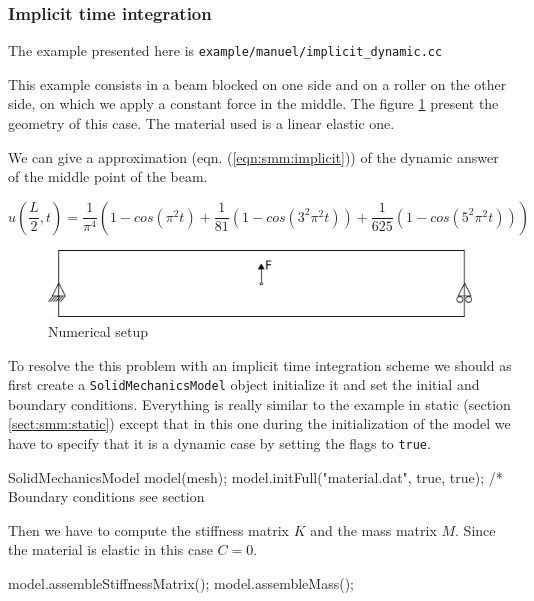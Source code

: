 \documentclass[a4paper,11pt]{book}
\newcommand{\code}[1]{{\tt{#1}}}
\begin{document}
\subsubsection{Implicit time integration}
The example presented here is \code{example/manuel/implicit\_dynamic.cc}

This example consists in a beam blocked on one side and on a roller on the other
side,  on  which   we  apply  a  constant  force  in   the  middle.  The  figure
\ref{fig:smm:implicit:dynamic} present  the geometry of this  case. The material
used is a linear elastic one.

We  can give  a  approximation (eqn.  (\ref{eqn:smm:implicit}))  of the  dynamic
answer of the middle point of the beam.

\begin{equation}\label{eqn:smm:implicit}
  u(\frac{L}{2}, t) = \frac{1}{\pi^4} (1 - cos(\pi^2 t) +
  \frac{1}{81}(1 - cos(3^2 \pi^2 t)) +
  \frac{1}{625}(1 - cos(5^2 \pi^2 t)))
\end{equation}


\begin{figure}[!htb]
  \centering
  \includegraphics[scale=.6]{figures/implicit_dynamic}
  \caption{Numerical setup}
  \label{fig:smm:implicit:dynamic}
\end{figure}

To resolve the  this problem with an implicit time  integration scheme we should
as first  create a \code{SolidMechanicsModel}  object initialize it and  set the
initial and boundary conditions. Everything  is really similar to the example in
static  (section  \ref{sect:smm:static}) except  that  in  this  one during  the
initialization of  the model we  have to  specify that it  is a dynamic  case by
setting the flags to \code{true}.

\begin{cpp}[escapechar=\%]
  SolidMechanicsModel model(mesh);
  model.initFull("material.dat", true, true);
  /* Boundary conditions see section %
\end{cpp}

Then we have to compute the stiffness  matrix $K$ and the mass matrix $M$. Since
the material is elastic in this case $C = 0$.
\begin{cpp}
 model.assembleStiffnessMatrix();
 model.assembleMass();
\end{cpp}
\end{document}

